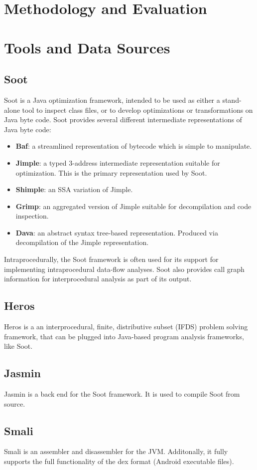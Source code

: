 \documentclass[12pt]{article}
\begin{document}
\section{Methodology and Evaluation}
\section{Tools and Data Sources}
\subsection{Soot}
Soot is a Java optimization framework, intended to be used as either a stand-alone tool to inspect class files, or to develop optimizations or transformations on Java byte code. Soot provides several different intermediate representations of Java byte code: \cite{lam11:_soot_java}
\begin{itemize}
    \item\textbf{Baf}: a streamlined representation of bytecode which is simple to manipulate.
    \item\textbf{Jimple}: a typed 3-address intermediate representation suitable for optimization. This is the primary representation used by Soot.
    \item\textbf{Shimple}: an SSA variation of Jimple.
    \item\textbf{Grimp}: an aggregated version of Jimple suitable for decompilation and code inspection.
    \item\textbf{Dava}: an abstract syntax tree-based representation. Produced via decompilation of the Jimple representation.
\end{itemize}
Intraprocedurally, the Soot framework is often used for its support for implementing intraprocedural data-flow analyses. Soot also provides call graph information for interprocedural analysis as part of its output. \cite{lam11:_soot_java}
\subsection{Heros}
Heros is a an interprocedural, finite, distributive subset (IFDS) problem solving framework, that can be plugged into Java-based program analysis frameworks, like Soot.
\subsection{Jasmin}
Jasmin is a back end for the Soot framework. It is used to compile Soot from source.
\subsection{Smali}
Smali is an assembler and disassembler for the JVM. Additonally, it fully supports the full functionality of the dex format (Android executable files).
\end{document}
